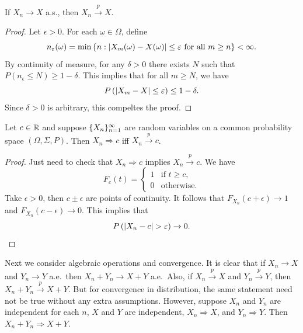 \documentclass[a4paper]{article}
\newcommand{\convd}{\Rightarrow}
\newcommand{\convp}{\xrightarrow{p}}
\begin{document}
\begin{prop}
  If $X_n \to X$ a.s., then $X_n \convp X$.
\end{prop}

\begin{proof}
  Let $\epsilon > 0$. For each $\omega \in \Omega$, define 
  \[
  n_\varepsilon (\omega) = \min \left\{ n : \left\lvert X_m(\omega) - X(\omega)\right\rvert 
  \leq \varepsilon \text{ for all $m \geq n$} \right\} < \infty.
  \]
  By continuity of measure, for any $\delta > 0$ there exists $N$ such that 
  $P \left( n_\epsilon \leq N \right) \geq 1 - \delta$.
  This implies that for all $m \geq N$, we have 
  \[
  P \left( \left\lvert X_m - X\right\rvert \leq \varepsilon \right) \leq 1 - \delta.
  \]
  Since $\delta > 0$ is arbitrary, this compeltes the proof.

\end{proof}

\begin{prop}
  Let $c \in \mathbb{R}$ and suppose $\{ X_n \}_{n=1}^\infty$ are random variables 
  on a common probability space 
  $(\Omega, \Sigma, P)$. Then $X_n \convd c$ iff $X_n \convp c$.
\end{prop}

\begin{proof}
  Just need to check that $X_n \convd c$ implies $X_n \convp c$.
  We have 
  \[
  F_c (t) = \begin{cases}
    1 & \text{if $t \geq c$,} \\
    0 & \text{otherwise.}
  \end{cases}
  \]
  Take $\epsilon > 0$, then $c \pm \epsilon$ are points of continuity.
  It follows that $F_{X_n} (c + \epsilon) \to 1$ and $F_{X_n} (c - \epsilon)
  \to 0$. This implies that 
  \[
  P \left( \left\lvert X_n - c\right\rvert > \varepsilon \right) \to 0.
  \]

\end{proof}


Next we consider algebraic operations and convergence.
It is clear that if $X_n \to X$ and $Y_n \to Y$ a.e.\, then $X_n + Y_n 
\to X + Y$ a.e.\ Also, if $X_n \convp X$ and $Y_n \convp Y$, then 
$X_n + Y_n \convp X + Y$. But for convergence in distribution, 
the same statement need not be true without any extra assumptions.
However, suppose $X_n$ and $Y_n$ are independent for each $n$, $X$ and $Y$
are independent, $X_n \convd X$, and $Y_n \convd Y$. Then $X_n + Y_n 
\convd X + Y$.
\end{document}
